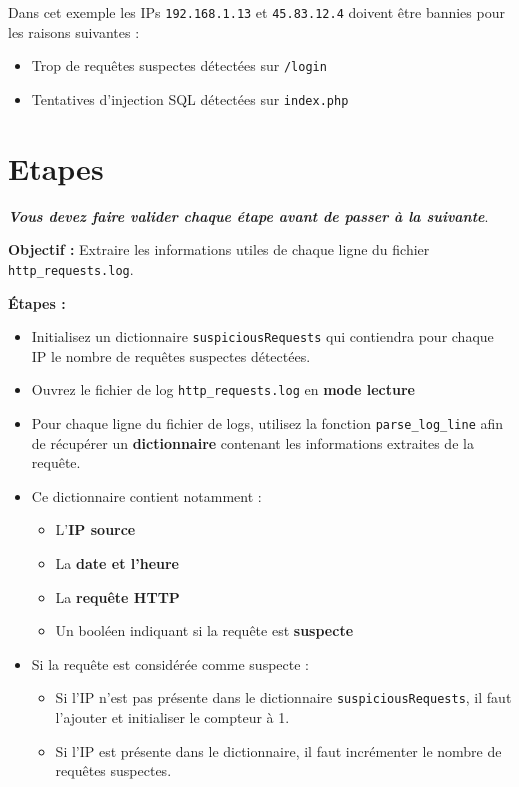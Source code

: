 \documentclass[12pt, a4paper]{exam}
\begin{document}
Dans cet exemple les IPs \texttt{192.168.1.13} et \texttt{45.83.12.4} doivent
être bannies pour les raisons suivantes :
\begin{itemize}
  \item Trop de requêtes suspectes détectées sur \texttt{/login}
  \item Tentatives d'injection SQL détectées sur \texttt{index.php}
\end{itemize}

\newpage
\section{Etapes}

\textit{\textbf{Vous devez faire valider chaque étape avant de passer à la suivante}}.

\begin{questions}


  \textbf{Objectif :} Extraire les informations utiles de chaque ligne du fichier \texttt{http\_requests.log}.

  \textbf{Étapes :}
  \begin{itemize}
    \item Initialisez un dictionnaire \texttt{suspiciousRequests} qui contiendra pour
          chaque IP le nombre de requêtes suspectes détectées.
    \item Ouvrez le fichier de log \texttt{http\_requests.log} en \textbf{mode lecture}      
    \item Pour chaque ligne du fichier de logs, utilisez la fonction
          \texttt{parse\_log\_line} afin de récupérer un \textbf{dictionnaire} contenant les
          informations extraites de la requête.
    \item Ce dictionnaire contient notamment :
          \begin{itemize}
            \item L'\textbf{IP source}
            \item La \textbf{date et l'heure}
            \item La \textbf{requête HTTP}
            \item Un booléen indiquant si la requête est \textbf{suspecte}
          \end{itemize}
    \item Si la requête est considérée comme suspecte :
          \begin{itemize}
            \item Si l'IP n'est pas présente dans le dictionnaire \texttt{suspiciousRequests}, il
                  faut l'ajouter et initialiser le compteur à 1.
            \item Si l'IP est présente dans le dictionnaire, il faut incrémenter le nombre de
                  requêtes suspectes.
          \end{itemize}
  \end{itemize}


\end{questions}
\end{document}

